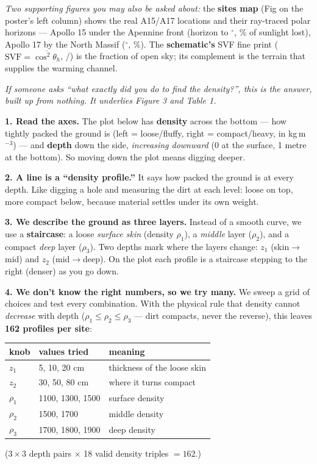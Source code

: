 \documentclass[11pt]{article}
\newcommand{\shead}[1]{\medskip\noindent{\color{teal}\large\bfseries #1}\par
  \nobreak\vspace{-2pt}{\color{teal}\rule{\linewidth}{0.6pt}}\par\smallskip}
\begin{document}
\medskip
\noindent\emph{Two supporting figures you may also be asked about:} the
\textbf{sites map} (Fig on the poster's left column) shows the real A15/A17
locations and their ray-traced polar horizons --- Apollo 15 under the
Apennine front (horizon to \horAfif$^\circ$, \lossAfif\% of sunlight lost),
Apollo 17 by the North Massif (\horAsev$^\circ$, \lossAsev\%). The
\textbf{schematic's} SVF fine print ($\mathrm{SVF}=\overline{\cos^2\theta_h}$,
\svfAfif/\svfAsev) is the fraction of open sky; its complement is the terrain
that supplies the warming channel.

\clearpage
\shead{Deep dive --- the density sweep, explained from zero}
\emph{If someone asks ``what exactly did you do to find the density?'', this is
the answer, built up from nothing. It underlies Figure 3 and Table 1.}

\medskip
\noindent\textbf{1. Read the axes.} The plot below has \textbf{density} across
the bottom --- how tightly packed the ground is (left = loose/fluffy,
right = compact/heavy, in kg\,m$^{-3}$) --- and \textbf{depth} down the side,
\emph{increasing downward} (0 at the surface, 1 metre at the bottom). So moving
down the plot means digging deeper.

\smallskip
\noindent\textbf{2. A line is a ``density profile.''} It says how packed the
ground is at every depth. Like digging a hole and measuring the dirt at each
level: loose on top, more compact below, because material settles under its own
weight.

\smallskip
\noindent\textbf{3. We describe the ground as three layers.} Instead of a
smooth curve, we use a \textbf{staircase}: a loose \emph{surface skin}
(density $\rho_1$), a \emph{middle} layer ($\rho_2$), and a compact \emph{deep}
layer ($\rho_3$). Two depths mark where the layers change: $z_1$ (skin$\to$mid)
and $z_2$ (mid$\to$deep). On the plot each profile is a staircase stepping to
the right (denser) as you go down.

\smallskip
\noindent\textbf{4. We don't know the right numbers, so we try many.} We sweep a
grid of choices and test every combination. With the physical rule that density
cannot \emph{decrease} with depth ($\rho_1\le\rho_2\le\rho_3$ --- dirt compacts,
never the reverse), this leaves \textbf{162 profiles per site}:
\begin{center}\small
\begin{tabular}{@{}lll@{}}
\toprule
knob & values tried & meaning\\
\midrule
$z_1$ & 5, 10, 20 cm & thickness of the loose skin\\
$z_2$ & 30, 50, 80 cm & where it turns compact\\
$\rho_1$ & 1100, 1300, 1500 & surface density\\
$\rho_2$ & 1500, 1700 & middle density\\
$\rho_3$ & 1700, 1800, 1900 & deep density\\
\bottomrule
\end{tabular}
\end{center}
($3{\times}3$ depth pairs $\times$ 18 valid density triples $=162$.)
\end{document}
